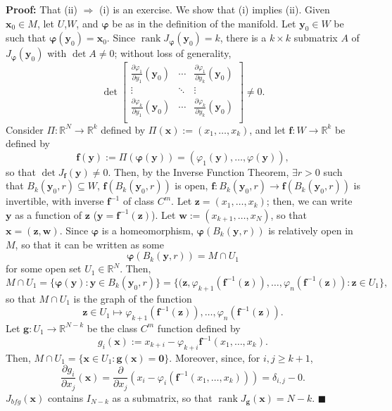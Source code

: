 \documentclass[11pt]{article}
\renewcommand{\qed}{\quad $\blacksquare$}
\newcommand{\bvarphi}{\boldsymbol{\varphi}}
\newcommand{\rank}{\operatorname{rank}}
\newcommand{\bzero}{\mathbf{0}}
\newcommand{\bw}{\mathbf{w}}
\newcommand{\bx}{\mathbf{x}}
\newcommand{\by}{\mathbf{y}}
\newcommand{\bz}{\mathbf{z}}
\newcommand{\bff}{\mathbf{f}}
\newcommand{\bfg}{\mathbf{g}}
\begin{document}
\begin{enumerate}
{\bf Proof:} That (ii) $\Rightarrow$ (i) is an exercise. We show that (i)
implies (ii). Given $\bx_0 \in M$, let $U$,$W$, and $\bvarphi$ be as in the
definition of the manifold. Let $\by_0 \in W$ be such that
$\bvarphi(\by_0) = \bx_0$. Since $\rank J_{\bvarphi}(\by_0) = k$, there is a
$k \times k$ submatrix $A$ of $J_{\bvarphi}(\by_0)$ with $\det A \neq 0$;
without loss of generality,
\[\det
    \begin{bmatrix}
        \frac{\partial \varphi_1}{\partial y_1}(\by_0)
            & \cdots
                & \frac{\partial \varphi_1}{\partial y_k}(\by_0) \\
        \vdots & \ddots & \vdots \\
        \frac{\partial \varphi_k}{\partial y_1}(\by_0)
            & \cdots
                & \frac{\partial \varphi_k}{\partial y_k}(\by_0) \\
    \end{bmatrix}
\neq 0.\]
Consider $\Pi: \mathbb{R}^N \rightarrow \mathbb{R}^k$ defined by
$\Pi(\bx) := (x_1,\ldots,x_k)$, and let $\bff: W \rightarrow \mathbb{R}^k$ be
defined by
\[\bff(\by)
 := \Pi(\bvarphi(\by))
 = (\varphi_1(\by),\ldots,\varphi(\by)),\]
so that $\det J_{\bff} (\by) \neq 0$. Then, by the Inverse Function Theorem,
$\exists r > 0$ such that $B_k(\by_0,r) \subseteq W$, $\bff(B_k(\by_0,r))$ is
open, $\bff: B_k(\by_0,r) \rightarrow \bff(B_k(\by_0,r))$ is invertible, with
inverse $\bff^{-1}$ of class $C^m$. Let $\bz = (x_1,\ldots,x_k)$; then, we can
write $\by$ as a function of $\bz$ ($\by = \bff^{-1}(\bz)$). Let
$\bw := (x_{k + 1},\ldots,x_N)$, so that $\bx = (\bz,\bw)$. Since $\bvarphi$
is a homeomorphism, $\bvarphi(B_k(\by,r))$ is relatively open in $M$, so that
it can be written as some \[\bvarphi(B_k(\by,r)) = M \cap U_1\] for some open
set $U_1 \in \mathbb{R}^N$. Then,
\[M \cap U_1
 = \{\bvarphi(\by) : \by \in B_k(\by_0,r)\}
 = \{(\bz,\varphi_{k + 1}(\bff^{-1}(\bz)),
                             \ldots,\varphi_{n}(\bff^{-1}(\bz)): \bz \in U_1\}
,\]
so that $M \cap U_1$ is the graph of the function
\[\bz \in U_1
 \mapsto \varphi_{k + 1}(\bff^{-1}(\bz)),\ldots,\varphi_{n}(\bff^{-1}(\bz)).\]
Let $\bfg: U_1 \rightarrow \mathbb{R}^{N - k}$ be the class $C^m$ function
defined by
\[g_i(\bx) := x_{k + i} - \varphi_{k + i}\bff^{-1}(x_1,\ldots,x_k).\]
Then, $M \cap U_1 = \{\bx \in U_1 : \bfg(\bx) = \bzero\}$. Moreover, since,
for $i,j \geq k + 1$,
\[\frac{\partial g_i}{\partial x_j}(\bx)
 = \frac{\partial}{\partial x_j} (x_i - \varphi_i(\bff^{-1}(x_1,\ldots,x_k)))
 = \delta_{i,j} - 0
.\]
$J_{bfg}(\bx)$ contains $I_{N - k}$ as a submatrix, so that
$\rank J_{\bfg}(\bx) = N - k$. \qed
\end{enumerate}
\end{document}
